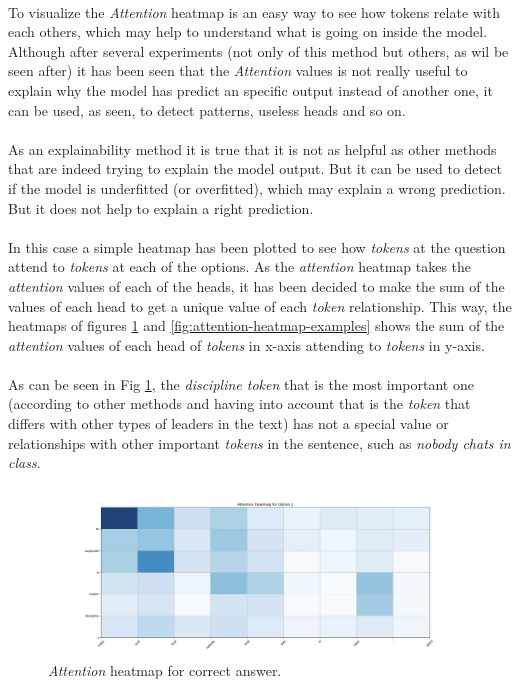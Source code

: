 \paragraph{}
To visualize the \emph{Attention} heatmap is an easy way to see how tokens relate with each others, which may help to understand what is going on inside the model. Although after several experiments (not only of this method but others, as wil be seen after) it has been seen that the \emph{Attention} values is not really useful to explain why the model has predict an specific output instead of another one, it can be used, as seen, to detect patterns, useless heads and so on.
\paragraph{}
As an explainability method it is true that it is not as helpful as other methods that are indeed trying to explain the model output. But it can be used to detect if the model is underfitted (or overfitted), which may explain a wrong prediction. But it does not help to explain a right prediction.
\paragraph{}
In this case a simple heatmap has been plotted to see how \emph{tokens} at the question attend to \emph{tokens} at each of the options. As the \emph{attention} heatmap takes the \emph{attention} values of each of the heads, it has been decided to make the sum of the values of each head to get a unique value of each \emph{token} relationship. This way, the heatmaps of figures \ref{fig:attention-heatmap-c} and \ref{fig:attention-heatmap-examples} shows the sum of the \emph{attention} values of each head of \emph{tokens} in x-axis attending to \emph{tokens} in y-axis.
\paragraph{}
As can be seen in Fig \ref{fig:attention-heatmap-c}, the \emph{discipline token} that is the most important one (according to other methods and having into account that is the \emph{token} that differs with other types of leaders in the text) has not a special value or relationships with other important \emph{tokens} in the sentence, such as \emph{nobody chats in class}. 
\begin{figure}[h]
	\centering
	\includegraphics[scale=0.35]{images/attention_heatmap_2}
	\caption{\emph{Attention} heatmap for correct answer.}
	\label{fig:attention-heatmap-c}
\end{figure}
